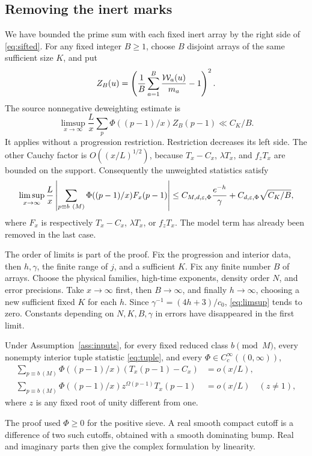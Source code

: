 \subsection{Removing the inert marks}

We have bounded the prime sum with each fixed inert array by the
right side of \eqref{eq:sifted}. For any fixed integer $B\geq1$,
choose $B$ disjoint arrays of the same sufficient size $K$, and put
\[
 Z_B(u)=\left(\frac1B\sum_{a=1}^B\frac{\mathcal W_a(u)}{m_a}-1\right)^2.
\]
The source nonnegative deweighting estimate is
\begin{equation}\label{eq:deweight}
 \limsup_{x\to\infty}\frac Lx\sum_p\Phi((p-1)/x)Z_B(p-1)
 \ll C_K/B.
\end{equation}
It applies without a progression restriction. Restriction decreases
its left side. The other Cauchy factor is $O((x/L)^{1/2})$, because
$T_x-C_x$, $\lambda T_x$, and $f_zT_x$ are bounded on the support.
Consequently the unweighted statistics satisfy
\begin{equation}\label{eq:limsup}
 \limsup_{x\to\infty}\frac Lx
 \left|\sum_{p\equiv b\ (M)}\Phi((p-1)/x)F_x(p-1)\right|
 \leq C_{M,d,\varepsilon,\Phi}\frac{e^{-h}}\gamma
                    +C_{d,\varepsilon,\Phi}\sqrt{C_K/B},
\end{equation}
where $F_x$ is respectively $T_x-C_x$, $\lambda T_x$, or $f_zT_x$.
The model term has already been removed in the last case.

The order of limits is part of the proof. Fix the progression and
interior data, then $h,\gamma$, the finite range of $j$, and a
sufficient $K$. Fix any finite number $B$ of arrays. Choose the
physical families, high-time exponents, density order $N$, and error
precisions. Take $x\to\infty$ first, then $B\to\infty$, and finally
$h\to\infty$, choosing a new sufficient fixed $K$ for each $h$.
Since $\gamma^{-1}=(4h+3)/c_0$, \eqref{eq:limsup} tends to zero.
Constants depending on $N,K,B,\gamma$ in errors have disappeared in
the first limit.

\begin{theorem}\label{thm:interior}
Under Assumption~\ref{ass:inputs}, for every fixed reduced class
$b\pmod M$, every nonempty interior tuple statistic
\eqref{eq:tuple}, and every $\Phi\in C_c^\infty((0,\infty))$,
\begin{align}
 \sum_{p\equiv b\ (M)}\Phi((p-1)/x)(T_x(p-1)-C_x)&=o(x/L),
       \label{eq:interiorunsigned}\\
 \sum_{p\equiv b\ (M)}\Phi((p-1)/x)z^{\Omega(p-1)}T_x(p-1)&=o(x/L)
       \quad(z\ne1),\label{eq:interiorsigned}
\end{align}
where $z$ is any fixed root of unity different from one.
\end{theorem}

The proof used $\Phi\geq0$ for the positive sieve. A real smooth
compact cutoff is a difference of two such cutoffs, obtained with a
smooth dominating bump. Real and imaginary parts then give the
complex formulation by linearity.
